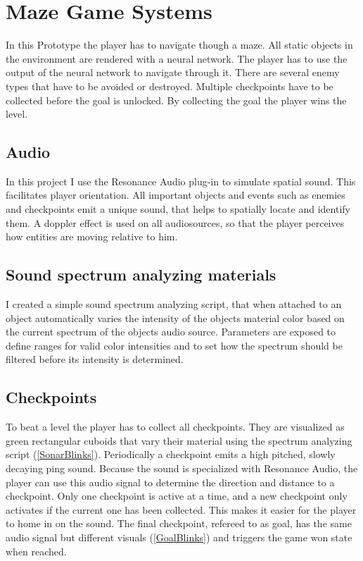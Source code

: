 
\chapter{Maze Game Systems}\label{MazeGameSystems}
 In this Prototype the player has to navigate though a maze. All static objects in the environment are rendered with a neural network. The player has to use the output of the neural network to navigate through it. There are several enemy types that have to be avoided or destroyed. Multiple checkpoints have to be collected before the goal is unlocked. By collecting the goal the player wins the level.

\section{Audio}
In this project I use the Resonance Audio plug-in to simulate spatial sound. This facilitates player orientation. All important objects and events such as enemies and checkpoints emit a unique sound, that helps to spatially locate and identify them. A doppler effect is used on all audiosources, so that the player perceives how entities are moving relative to him.


\section{Sound spectrum analyzing materials}
I created a simple sound spectrum analyzing script, that when attached to an object automatically varies the intensity of the objects material color based on the current spectrum of the objects audio source. Parameters are exposed to define ranges for valid color intensities and to set how the spectrum should be filtered before its intensity is determined.


\section{Checkpoints}
To beat a level the player has to collect all checkpoints. They are visualized as green rectangular cuboids that vary their material using the spectrum analyzing script (\cref{SonarBlinks}). Periodically a checkpoint emits a high pitched, slowly decaying ping sound. Because the sound is specialized with Resonance Audio, the player can use this audio signal to determine the direction and distance to a checkpoint. Only one checkpoint is active at a time, and a new checkpoint only activates if the current one has been collected. This makes it easier for the player to home in on the sound. The final checkpoint, refereed to as goal, has the same audio signal but different visuals (\cref{GoalBlinks}) and triggers the game won state when reached.

